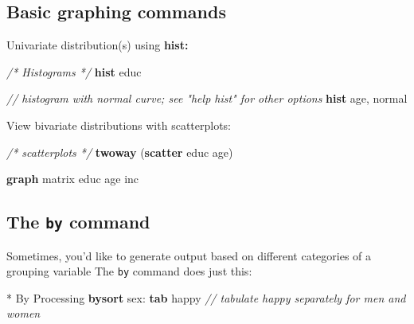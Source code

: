 \documentclass[
]{book}
\newenvironment{Shaded}{\begin{snugshade}}{\end{snugshade}}
\newcommand{\CommentTok}[1]{\textcolor[rgb]{0.56,0.35,0.01}{\textit{#1}}}
\newcommand{\FunctionTok}[1]{\textcolor[rgb]{0.00,0.00,0.00}{#1}}
\newcommand{\KeywordTok}[1]{\textcolor[rgb]{0.13,0.29,0.53}{\textbf{#1}}}
\newcommand{\NormalTok}[1]{#1}
\begin{document}
\hypertarget{basic-graphing-commands}{%
\subsection{Basic graphing commands}\label{basic-graphing-commands}}

Univariate distribution(s) using \textbf{hist:}

\begin{Shaded}
\begin{Highlighting}[]
  \CommentTok{/* Histograms */}
  \KeywordTok{hist}\NormalTok{ educ}
\end{Highlighting}
\end{Shaded}

\begin{Shaded}
\begin{Highlighting}[]
  \CommentTok{// histogram with normal curve; see "help hist" for other options}
  \KeywordTok{hist}\NormalTok{ age, }\FunctionTok{normal}  
\end{Highlighting}
\end{Shaded}

View bivariate distributions with scatterplots:

\begin{Shaded}
\begin{Highlighting}[]
   \CommentTok{/* scatterplots */}
   \KeywordTok{twoway}\NormalTok{ (}\KeywordTok{scatter}\NormalTok{ educ age)}
\end{Highlighting}
\end{Shaded}

\begin{Shaded}
\begin{Highlighting}[]
\KeywordTok{graph} \FunctionTok{matrix}\NormalTok{ educ age inc}
\end{Highlighting}
\end{Shaded}

\hypertarget{the-by-command}{%
\subsection{\texorpdfstring{The \texttt{by} command}{The by command}}\label{the-by-command}}

Sometimes, you'd like to generate output based on different categories of a grouping variable
The \texttt{by} command does just this:

\begin{Shaded}
\begin{Highlighting}[]
\NormalTok{* By Processing}
\KeywordTok{bysort}\NormalTok{ sex: }\KeywordTok{tab}\NormalTok{ happy }\CommentTok{// tabulate happy separately for men and women}
\end{Highlighting}
\end{Shaded}
\end{document}
